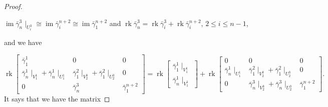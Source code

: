 \documentclass[a4paper,12pt]{amsart}
\newcommand{\bg}{\bar{\gamma}}
\DeclareMathOperator{\rk}{rk}
\DeclareMathOperator{\im}{im}
\begin{document}
\begin{proof}
\begin{center}
$ \im \bg^3_n\mid_{U^3_i}\cong \im \bg^{n+2}_i\cong \im \bg^{n+2}_1$ and $\rk \bg^3_n=\rk \bg^3_i+\rk \bg^{n+2}_i$, $2\leq i\leq n-1$,
\end{center}
and we have



\begin{equation}
\rk \begin{bmatrix}
\bg^1_1 & 0 & 0 \\
\bg^1_n\mid_{V^1_1}+\bg^1_n\mid_{U^1_1} & \bg^2_1\mid_{V^3_2}+\bg^2_1\mid_{U^3_2} & 0\\
0 & \bg^3_n& \bg^{n+2}_1
\end{bmatrix}=\rk \begin{bmatrix}
\bg^1_1\mid_{V^1_1} \\
\bg^1_n\mid_{V^1_1}
\end{bmatrix} +\rk  \begin{bmatrix}
0& 0 & 0 \\
\bg^1_n\mid_{U^1_1} &\bg^2_1\mid_{V^3_2}+\bg^2_1\mid_{U^3_2} & 0\\
0 & \bg^3_n\mid_{V^3_2}+\bg^3_n\mid_{U^3_2} & \bg^{n+2}_1
\end{bmatrix}.   
\end{equation}
It says that we have the matrix 



\end{proof}
\end{document}
